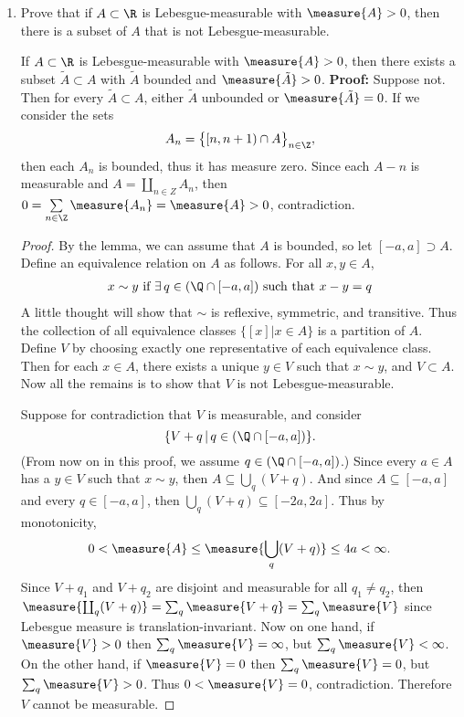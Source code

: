 \documentclass[12pt,letterpaper]{article}
\begin{document}
\begin{enumerate}
\pagebreak
\item Prove that if $A\subset\R$ is Lebesgue-measurable with $\measure{A}>0$, then there is a subset of $A$ that is not Lebesgue-measurable. 
\begin{lemma*}
	If $A\subset\R$ is Lebesgue-measurable with $\measure{A}>0$, then there exists a subset $\tilde{A}\subset A$ with $\tilde{A}$ bounded and $\measure{\tilde{A}}>0$. \textbf{Proof:} Suppose not. Then for every $\tilde{A}\subset A$, either $\tilde{A}$ unbounded or $\measure{\tilde{A}}=0$. If we consider the sets 
	$$A_n=\big\lbrace[n,n+1)\cap A\big\rbrace_{n\in\Z},$$
	then each $A_n$ is bounded, thus it has measure zero. Since each $A-n$ is measurable and $A=\coprod\limits_{n\in Z}A_n$, then $0=\sum\limits_{n\in\Z}\measure{A_n}=\measure{A}>0$, contradiction. \qedwhite
\end{lemma*}
\begin{proof}
By the lemma, \Wlog{} we can assume that $A$ is bounded, so let $[-a,a]\supset A$. Define an equivalence relation on $A$ as follows. For all $x,y\in A$, 
\begin{align*}
x\sim y \text{ if } \exists\, q\in(\Q\cap[-a,a]) \text{ such that } x-y=q
\end{align*}
A little thought will show that $\sim$ is reflexive, symmetric, and transitive. Thus the collection of all equivalence classes $\{[x]|x\in A\}$ is a partition of $A$. Define $V$ by choosing exactly one representative of each equivalence class. Then for each $x\in A$, there exists a unique $y\in V$ such that $x\sim y$, and $V\subset A$. Now all the remains is to show that $V$ is not Lebesgue-measurable. 

Suppose for contradiction that $V$ is measurable, and consider 
$$\{V+q\,|\,q\in(\Q\cap[-a,a])\}.$$ 
(From now on in this proof, we assume $q\in(\Q\cap[-a,a])$.) Since every $a\in A$ has a $y\in V$ such that $x\sim y$, then $A\subseteq\bigcup_q (V+q)$. And since $A\subseteq [-a,a]$ and every $q\in[-a,a]$, then $\bigcup_q (V+q)\subseteq [-2a,2a]$. Thus by monotonicity, 
$$0<\measure{A}\leq\measure{\bigcup_{q}(V+q)}\leq4a<\infty.$$
Since $V+q_1$ and $V+q_2$ are disjoint and measurable for all $q_1\neq q_2$, then $\measure{\coprod_{q}(V+q)}=\sum_q\measure{V+q}=\sum_q\measure{V}$ since Lebesgue measure is translation-invariant. Now on one hand, if $\measure{V}>0$ then $\sum_q\measure{V}=\infty$, but $\sum_q\measure{V}<\infty$. On the other hand, if $\measure{V}=0$ then $\sum_q\measure{V}=0$, but $\sum_q\measure{V}>0$. Thus $0<\measure{V}=0$, contradiction. Therefore $V$ cannot be measurable. 
\end{proof}


\end{enumerate}
\end{document}
